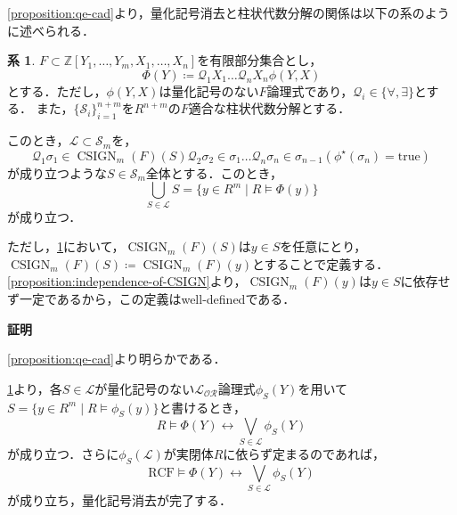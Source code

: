 \documentclass[uplatex, dvipdfmx]{jsarticle}
\makeatletter
\numberwithin{equation}{section}
\renewenvironment{proof}[1][\proofname]{\par
  \pushQED{\qed}%
  \normalfont \topsep6\p@\@plus6\p@\relax
  \trivlist
  \item\relax
  {\bfseries
  #1\@addpunct{.}}\hspace\labelsep\ignorespaces
}{
  \popQED\endtrivlist\@endpefalse
}
\newcommand{\Z}{\mathbb{Z}}
\newcommand{\Qua}{\mathcal{Q}}
\newcommand{\RCF}{\mathrm{RCF}}
\newcommand{\true}{\text{true}}
\DeclareMathOperator{\CSIGN}{CSIGN}
\theoremstyle{definition}
\newtheorem{corollary}[definition]{系}
\renewcommand{\proofname}{\textbf{証明}}
\makeatother
\begin{document}
\cref{proposition:qe-cad}より，量化記号消去と柱状代数分解の関係は以下の系のように述べられる．

\begin{corollary} \label{corollary:qe-cad}
     $F \subset \Z[Y_1, \dots, Y_m, X_1, \dots, X_n]$を有限部分集合とし，
     \begin{equation}
          \Phi(Y)\coloneqq \Qua_1 X_1 \dots \Qua_n X_n \phi(Y,X)
     \end{equation}
     とする．ただし，$\phi(Y,X)$は量化記号のない$F$論理式であり，$\Qua_i \in \{\forall, \exists\}$とする．
     また，$\{\mathcal{S}_i\}_{i=1}^{n+m}$を$R^{n+m}$の$F$適合な柱状代数分解とする．

     このとき，$\mathcal{L} \subset \mathcal{S}_m$を，
     \begin{equation}
          \Qua_1 \sigma_1 \in \CSIGN_m(F)(S) \Qua_2 \sigma_2 \in \sigma_1 \dots \Qua_n \sigma_n \in \sigma_{n-1}(\phi^\star(\sigma_n) = \true)
     \end{equation}
     が成り立つような$S \in \mathcal{S}_m$全体とする．このとき，
     \begin{equation}
          \bigcup_{S \in \mathcal{L}} S = \{y \in R^m \mid R \models \Phi(y)\}
     \end{equation}
     が成り立つ．
\end{corollary}

ただし，\cref{corollary:qe-cad}において，$\CSIGN_m(F)(S)$は$y \in S$を任意にとり，$\CSIGN_m(F)(S) \coloneqq \CSIGN_m(F)(y)$とすることで定義する．
\cref{proposition:independence-of-CSIGN}より，$\CSIGN_m(F)(y)$は$y \in S$に依存せず一定であるから，この定義はwell-definedである．

\begin{proof}
     \cref{proposition:qe-cad}より明らかである．
\end{proof}

\cref{corollary:qe-cad}より，各$S \in \mathcal{L}$が量化記号のない$\mathcal{L}_\mathcal{OR}$論理式$\phi_S(Y)$を用いて
$S = \{y \in R^m \mid R \models \phi_S(y)\} $と書けるとき，
\begin{equation}
     R \models \Phi(Y) \leftrightarrow \bigvee_{S \in \mathcal{L}} \phi_S(Y) 
\end{equation}
が成り立つ．さらに$\phi_S(\mathcal{L})$が実閉体$R$に依らず定まるのであれば，
\begin{equation}
     \RCF \models \Phi(Y) \leftrightarrow \bigvee_{S \in \mathcal{L}} \phi_S(Y) 
\end{equation}
が成り立ち，量化記号消去が完了する．
\end{document}
